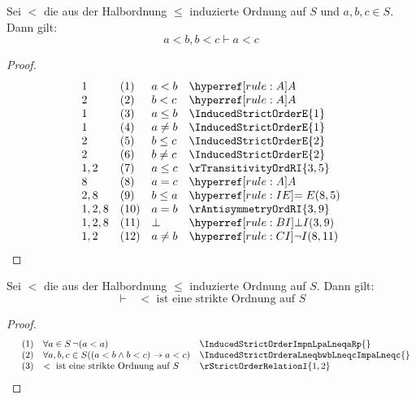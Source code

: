 \documentclass[main.tex]{subfiles}
\begin{document}
\label{InducedStrictOrderaLneqbwbLneqcImpaLneqc}
\begin{theorem}
    Sei \(<\) die aus der Halbordnung \(\leq\) induzierte Ordnung auf \(S\) und \(a,b,c\in S\). Dann gilt:
    \[
    a<b,b<c\vdash a < c
    \]
\end{theorem}
\begin{proof}
	\[
	\begin{array}{llll}
		1     & (1) & a<b & \rA\\
		2     & (2) & b<c & \rA\\
		1     & (3) & a\leq b & \InducedStrictOrderE{1}\\
        1     & (4) & a\neq b & \InducedStrictOrderE{1}\\
        2     & (5) & b\leq c & \InducedStrictOrderE{2}\\
        2     & (6) & b\neq c & \InducedStrictOrderE{2}\\
        1,2   & (7) & a\leq c & \rTransitivityOrdRI{3,5}\\
        8     & (8) & a=c & \rA\\
        2,8   & (9) & b\leq a & \rIE{8,5}\\
        1,2,8 & (10) & a=b & \rAntisymmetryOrdRI{3,9}\\
        1,2,8 & (11) & \bot & \rBI{3,9}\\
        1,2   & (12) & a\neq b & \rCI{8,11}\\
	\end{array}
	\]
\end{proof}

\label{InducedStrictOrderFromHalfOrder}
\begin{theorem}
    Sei \(<\) die aus der Halbordnung \(\leq\) induzierte Ordnung auf \(S\). Dann gilt:
    \[
    \vdash \text{ } < \text{ ist eine strikte Ordnung auf }S
    \]
\end{theorem}
\begin{proof}
	\[
        \begin{array}{llll}
          & (1) & \forall a \in S \, \neg (a < a) & \InducedStrictOrderImpnLpaLneqaRp{} \\
          & (2) & \forall a, b, c \in S ((a < b \land b < c) \rightarrow a < c) & \InducedStrictOrderaLneqbwbLneqcImpaLneqc{} \\
          & (3) & < \text{ ist eine strikte Ordnung auf } S & \rStrictOrderRelationI{1,2}
        \end{array}
	\]
\end{proof}
\end{document}
